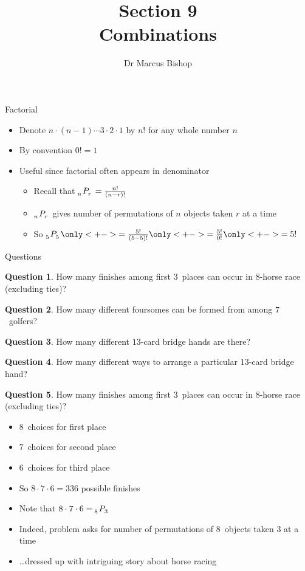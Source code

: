 \documentclass{beamer}
\title[\S9]{Section 9\\Combinations}
\author{Dr Marcus Bishop}
\theoremstyle{definition}
\newtheorem{question}{Question}
\newcommand\npr[2]{\tensor[_{#1}]P{_{#2}}}
\begin{document}
\begin{frame}\titlepage\end{frame}
\LogoOff

\begin{frame}{Factorial}
\begin{itemize}
\item Denote $n\cdot\left(n-1\right)\cdots 3\cdot 2\cdot 1$
by $n!$ for any whole number $n$
\item By convention $0!=1$
\item Useful since factorial often appears in denominator
\begin{example}
\begin{itemize}
\item Recall that $\npr{n}{r}=\frac{n!}{\left(n-r\right)!}$
\item $\npr{n}{r}$ gives number of permutations of $n$
objects taken $r$ at a time
\item So $\npr{5}{5}
\only<+->{=\frac{5!}{\left(5-5\right)!}}
\only<+->{=\frac{5!}{0!}}
\only<+->{=5!}$
\end{itemize}
\end{example}
\end{itemize}
\end{frame}

\begin{frame}{Questions}
\begin{question}
How many finishes among first $3$~places
can occur in $8$-horse race (excluding ties)?
\end{question}
\begin{question}
How many different foursomes can be formed
from among $7$~golfers?
\end{question}
\begin{question}
How many different $13$-card bridge hands are there?
\end{question}
\begin{question}
How many different ways to arrange a particular $13$-card
bridge hand?
\end{question}
\end{frame}

\begin{frame}
\begin{question}
How many finishes among first $3$~places
can occur in $8$-horse race (excluding ties)?
\end{question}
\begin{itemize}
\item $8$~choices for first place
\item $7$~choices for second place
\item $6$~choices for third place
\item So $8\cdot 7\cdot 6=336$ possible finishes
\item Note that $8\cdot 7\cdot 6=\npr{8}{3}$
\item Indeed, problem asks for number of permutations
of $8$~objects taken $3$ at a time
\item \dots dressed up with intriguing story about horse racing
\end{itemize}
\end{frame}
\end{document}
